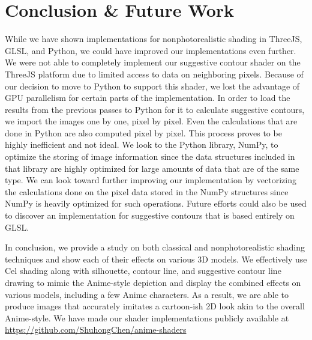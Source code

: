 \documentclass[10pt,twocolumn,letterpaper]{article}
\begin{document}
\section{Conclusion \& Future Work}
\label{sec:conclusion}

While we have shown implementations for nonphotorealistic shading in ThreeJS, GLSL, and Python, we could have improved our implementations even further. We were not able to completely implement our suggestive contour shader \cite{DeCarlo:2003:SCF} on the ThreeJS platform due to limited access to data on neighboring pixels. Because of our decision to move to Python to support this shader, we lost the advantage of GPU parallelism for certain parts of the implementation. In order to load the results from the previous passes to Python for it to calculate suggestive contours, we import the images one by one, pixel by pixel. Even the calculations that are done in Python are also computed pixel by pixel. This process proves to be highly inefficient and not ideal. We look to the Python library, NumPy, to optimize the storing of image information since the data structures included in that library are highly optimized for large amounts of data that are of the same type. We can look toward further improving our implementation by vectorizing the calculations done on the pixel data stored in the NumPy structures since NumPy is heavily optimized for such operations. Future efforts could also be used to discover an implementation for suggestive contours that is based entirely on GLSL.

In conclusion, we provide a study on both classical and nonphotorealistic shading techniques and show each of their effects on various 3D models. We effectively use Cel shading \cite{wiki:Cel_shading} along with silhouette, contour line, and suggestive contour line drawing \cite{DeCarlo:2003:SCF} to mimic the Anime-style depiction and display the combined effects on various models, including a few Anime characters. As a result, we are able to produce images that accurately imitates a cartoon-ish 2D look akin to the overall Anime-style. We have made our shader implementations publicly available at \url{https://github.com/ShuhongChen/anime-shaders}

{\small


}


\setcounter{section}{0}
\renewcommand\thesection{\Alph{section}}
\renewcommand\thesubsection{\thesection.\Alph{subsection}}
\end{document}

